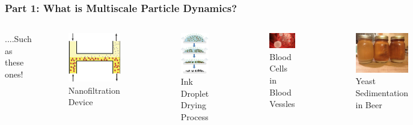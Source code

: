 \documentclass[aspectratio=169,xcolor=dvipsnames]{beamer}
\begin{document}
\begin{frame}
	\frametitle{Part 1: What is Multiscale Particle Dynamics?}
	
	\begin{columns}
		....Such as these ones!\\
		
		\begin{columns}	
			\begin{figure}
				\includegraphics[width=4cm]{Microfilter.png}
				\caption{ Nanofiltration Device}
			\end{figure}
			\begin{figure}		
				\includegraphics[width=4cm]{printing1.png}
				\caption{Ink Droplet Drying Process}
			\end{figure}
		\end{columns}
		
		\begin{figure}
			\includegraphics[width=3cm]{bloodcells.jpg}
			\caption{Blood Cells in Blood Vessles}
		\end{figure}
		\begin{figure}
			\includegraphics[width=3cm]{beer.jpg}
			\caption{Yeast Sedimentation in Beer}
		\end{figure}
		
	\end{columns}
\end{frame}
\end{document}
